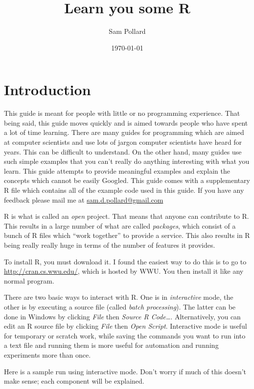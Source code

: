\documentclass[12pt]{article}
\begin{document}
\title{Learn you some R}
\author{Sam Pollard}
\date{\today}
\maketitle

\section{Introduction}

This guide is meant for people with little or no programming experience. That being said, this guide moves quickly and is aimed towards people who have spent a lot of time learning. There are many guides for programming which are aimed at computer scientists and use lots of jargon computer scientists have heard for years. This can be difficult to understand. On the other hand, many guides use such simple examples that you can't really do anything interesting with what you learn. This guide attempts to provide meaningful examples and explain the concepts which cannot be easily Googled. This guide comes with a supplementary R file which contains all of the example code used in this guide. If you have any feedback please mail me at \url{sam.d.pollard@gmail.com}

R is what is called an \emph{open} project. That means that anyone can contribute to R. This results in a large number of what are called \emph{packages}, which consist of a bunch of R files which ``work together'' to provide a service. This also results in R being really really huge in terms of the number of features it provides.

To install R, you must download it. I found the easiest way to do this is to go to \url{http://cran.cs.wwu.edu/}, which is hosted by WWU. You then install it like any normal program.

There are two basic ways to interact with R. One is in \emph{interactive} mode, the other is by executing a source file (called \emph{batch processing}). The latter can be done in Windows by clicking \emph{File} then \emph{Source R Code\dots}. Alternatively, you can edit an R source file by clicking \emph{File} then \emph{Open Script}. Interactive mode is useful for temporary or scratch work, while saving the commands you want to run into a text file and running them is more useful for automation and running experiments more than once.

Here is a sample run using interactive mode. Don't worry if much of this doesn't make sense; each component will be explained.
\end{document}
